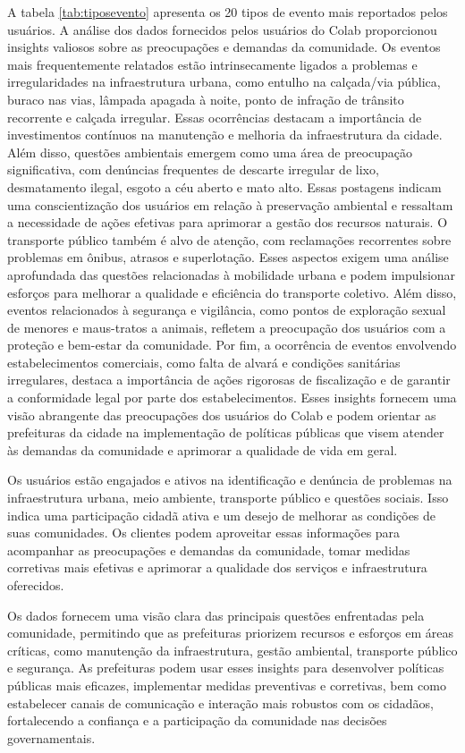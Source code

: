 A tabela \autoref{tab:tiposevento} apresenta os 20 tipos de evento mais reportados pelos usuários. A análise dos dados fornecidos pelos usuários do Colab proporcionou insights valiosos sobre as preocupações e demandas da comunidade. Os eventos mais frequentemente relatados estão intrinsecamente ligados a problemas e irregularidades na infraestrutura urbana, como entulho na calçada/via pública, buraco nas vias, lâmpada apagada à noite, ponto de infração de trânsito recorrente e calçada irregular. Essas ocorrências destacam a importância de investimentos contínuos na manutenção e melhoria da infraestrutura da cidade. Além disso, questões ambientais emergem como uma área de preocupação significativa, com denúncias frequentes de descarte irregular de lixo, desmatamento ilegal, esgoto a céu aberto e mato alto. Essas postagens indicam uma conscientização dos usuários em relação à preservação ambiental e ressaltam a necessidade de ações efetivas para aprimorar a gestão dos recursos naturais. O transporte público também é alvo de atenção, com reclamações recorrentes sobre problemas em ônibus, atrasos e superlotação. Esses aspectos exigem uma análise aprofundada das questões relacionadas à mobilidade urbana e podem impulsionar esforços para melhorar a qualidade e eficiência do transporte coletivo. Além disso, eventos relacionados à segurança e vigilância, como pontos de exploração sexual de menores e maus-tratos a animais, refletem a preocupação dos usuários com a proteção e bem-estar da comunidade. Por fim, a ocorrência de eventos envolvendo estabelecimentos comerciais, como falta de alvará e condições sanitárias irregulares, destaca a importância de ações rigorosas de fiscalização e de garantir a conformidade legal por parte dos estabelecimentos. Esses insights fornecem uma visão abrangente das preocupações dos usuários do Colab e podem orientar as prefeituras da cidade na implementação de políticas públicas que visem atender às demandas da comunidade e aprimorar a qualidade de vida em geral.

Os usuários estão engajados e ativos na identificação e denúncia de problemas na infraestrutura urbana, meio ambiente, transporte público e questões sociais. Isso indica uma participação cidadã ativa e um desejo de melhorar as condições de suas comunidades.
Os clientes podem aproveitar essas informações para acompanhar as preocupações e demandas da comunidade, tomar medidas corretivas mais efetivas e aprimorar a qualidade dos serviços e infraestrutura oferecidos.

Os dados fornecem uma visão clara das principais questões enfrentadas pela comunidade, permitindo que as prefeituras priorizem recursos e esforços em áreas críticas, como manutenção da infraestrutura, gestão ambiental, transporte público e segurança. As prefeituras podem usar esses insights para desenvolver políticas públicas mais eficazes, implementar medidas preventivas e corretivas, bem como estabelecer canais de comunicação e interação mais robustos com os cidadãos, fortalecendo a confiança e a participação da comunidade nas decisões governamentais.

